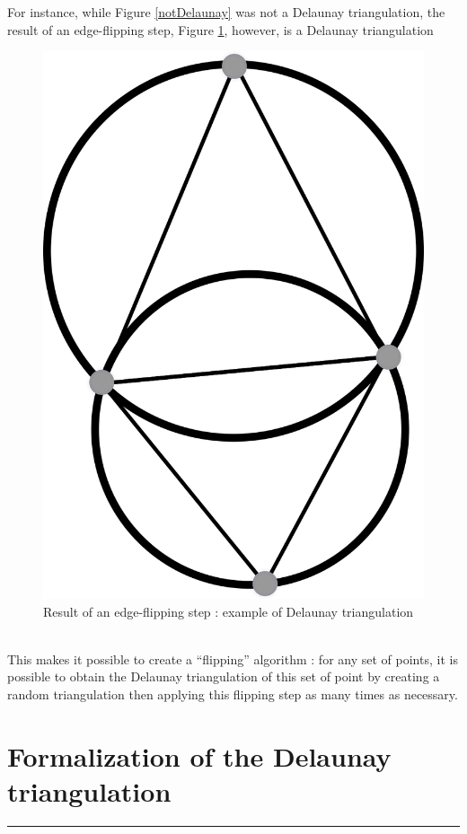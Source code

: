 \documentclass[a4paper,10pt]{article}
\begin{document}
For instance, while Figure \ref{notDelaunay} was not a Delaunay triangulation, the result of an edge-flipping step, Figure \ref{DelaunayTriangulation}, however, is a Delaunay triangulation
\begin{figure}[h]
\centering

\caption{\label{DelaunayTriangulation} Result of an edge-flipping step : example of Delaunay triangulation}
\includegraphics[scale=1]{dessin1}
\end{figure}\\
This makes it possible to create a ``flipping'' algorithm : for any set of points, it is possible to obtain the Delaunay triangulation of this set of point by creating a random triangulation then applying this flipping step as many times as necessary.
\section{Formalization of the Delaunay triangulation}
\rule{\linewidth}{0.5pt}
\end{document}
